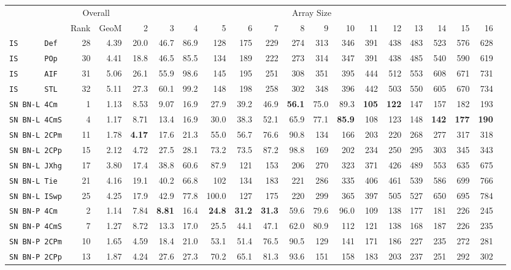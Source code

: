 \begin{tabular}{l | r @{~~} r | r@{~~}r@{~~}r@{~~}r@{~~}r@{~~}r@{~~}r@{~~}r@{~~}r@{~~}r@{~~}r@{~~}r@{~~}r@{~~}r@{~~}r@{~~}r|}
 & \multicolumn{2}{c|}{Overall} & \multicolumn{15}{c}{Array Size} \\
 & Rank & GeoM & 2&3&4&5&6&7&8&9&10&11&12&13&14&15&16\\ \hline
\verb+IS      Def+ & 28 & 4.39 & 20.0&46.7&86.9&128&175&229&274&313&346&391&438&483&523&576&628\\
\verb+IS      POp+ & 30 & 4.41 & 18.8&46.5&85.5&134&189&222&273&314&347&391&438&485&540&590&619\\
\verb+IS      AIF+ & 31 & 5.06 & 26.1&55.9&98.6&145&195&251&308&351&395&444&512&553&608&671&731\\
\verb+IS      STL+ & 32 & 5.11 & 27.3&60.1&99.2&148&198&258&302&348&396&442&503&550&605&670&734\smallskip \\
\verb+SN BN-L 4Cm + & 1 & 1.13 & 8.53&9.07&16.9&27.9&39.2&46.9&\textbf{56.1}&75.0&89.3&\textbf{105}&\textbf{122}&147&157&182&193\\
\verb+SN BN-L 4CmS+ & 4 & 1.17 & 8.71&13.4&16.9&30.0&38.3&52.1&65.9&77.1&\textbf{85.9}&108&123&148&\textbf{142}&\textbf{177}&\textbf{190}\\
\verb+SN BN-L 2CPm+ & 11 & 1.78 & \textbf{4.17}&17.6&21.3&55.0&56.7&76.6&90.8&134&166&203&220&268&277&317&318\\
\verb+SN BN-L 2CPp+ & 15 & 2.12 & 4.72&27.5&28.1&73.2&73.5&87.2&98.8&169&202&234&250&295&303&345&343\\
\verb+SN BN-L JXhg+ & 17 & 3.80 & 17.4&38.8&60.6&87.9&121&153&206&270&323&371&426&489&553&635&675\\
\verb+SN BN-L Tie + & 21 & 4.16 & 19.1&40.2&66.8&102&134&183&221&286&335&406&461&539&586&699&766\\
\verb+SN BN-L ISwp+ & 25 & 4.25 & 17.9&42.9&77.8&100.0&127&175&220&299&365&397&505&527&650&695&784\smallskip \\
\verb+SN BN-P 4Cm + & 2 & 1.14 & 7.84&\textbf{8.81}&16.4&\textbf{24.8}&\textbf{31.2}&\textbf{31.3}&59.6&79.6&96.0&109&138&177&181&226&245\\
\verb+SN BN-P 4CmS+ & 7 & 1.27 & 8.72&13.3&17.0&25.5&44.1&47.1&62.0&80.9&112&121&138&168&187&226&235\\
\verb+SN BN-P 2CPm+ & 10 & 1.65 & 4.59&18.4&21.0&53.1&51.4&76.5&90.5&129&141&171&186&227&235&272&281\\
\verb+SN BN-P 2CPp+ & 13 & 1.87 & 4.24&27.6&27.3&70.2&65.1&81.3&93.6&151&158&183&203&237&251&292&302\\

\end{tabular}
